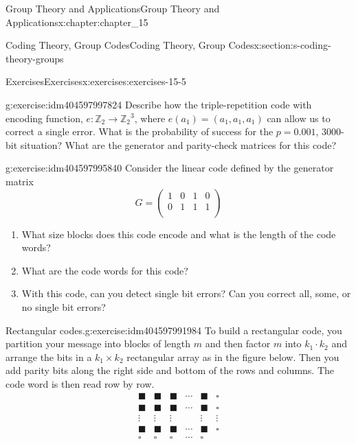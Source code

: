 \documentclass[twoside,10pt,]{book}
\numberwithin{equation}{section}
\begin{document}
\begin{chapterptx}{Group Theory and Applications}{}{Group Theory and Applications}{}{}{x:chapter:chapter_15}
\begin{sectionptx}{Coding Theory, Group Codes}{}{Coding Theory, Group Codes}{}{}{x:section:s-coding-theory-groups}
\begin{exercises-subsection}{Exercises}{}{Exercises}{}{}{x:exercises:exercises-15-5}
\begin{divisionexercise}{4}{}{}{g:exercise:idm404597997824}
Describe how the triple-repetition code with encoding function, \(e:\mathbb{Z}_2\to \mathbb{Z}_2{}^3\), where \(e\left(a_1\right) = \left(a_1,a_1,a_1\right)\) can allow us to correct a single error. What is the probability of success for the \(p = 0.001\), 3000-bit situation?  What are the generator and parity-check matrices for this code?%
\end{divisionexercise}%
\begin{divisionexercise}{5}{}{}{g:exercise:idm404597995840}%
Consider the  linear code defined by the generator matrix%
\begin{equation*}
G=\left(
\begin{array}{cccc}
1 & 0 & 1 & 0 \\
0 & 1 & 1 & 1 \\
\end{array}
\right)
\end{equation*}
%
\par
%
\begin{enumerate}[label=(\alph*)]
\item{}What size blocks does this code encode and what is the length of the code words?%
\item{}What are the code words for this code?%
\item{}With this code, can you detect single bit errors?  Can you correct all, some, or no single bit errors?%
\end{enumerate}
%
\end{divisionexercise}%
\begin{divisionexercise}{6}{Rectangular codes.}{}{g:exercise:idm404597991984}%
To build a rectangular code, you partition your message into blocks of length \(m\) and then factor \(m\) into \(k_1\cdot k_2\)  and arrange the bits in a  \(k_1 \times k_2\) rectangular array as in the figure below.  Then you add parity bits along the right side and bottom of the rows and columns.   The code word is then read row by row.%
\begin{equation*}
\begin{array}{cccccc}
\blacksquare  & \blacksquare  & \blacksquare  & \cdots  & \blacksquare  & \square  \\
\blacksquare  & \blacksquare  & \blacksquare  & \cdots  & \blacksquare  & \square  \\
\vdots  & \vdots  & \vdots  &   & \vdots  & \vdots  \\
\blacksquare  & \blacksquare  & \blacksquare  & \cdots  & \blacksquare  & \square  \\
\square  & \square  & \square  & \cdots  & \square  &   \\

\end{array}
\end{equation*}
\end{divisionexercise}
\end{exercises-subsection}
\end{sectionptx}
\end{chapterptx}
\end{document}
